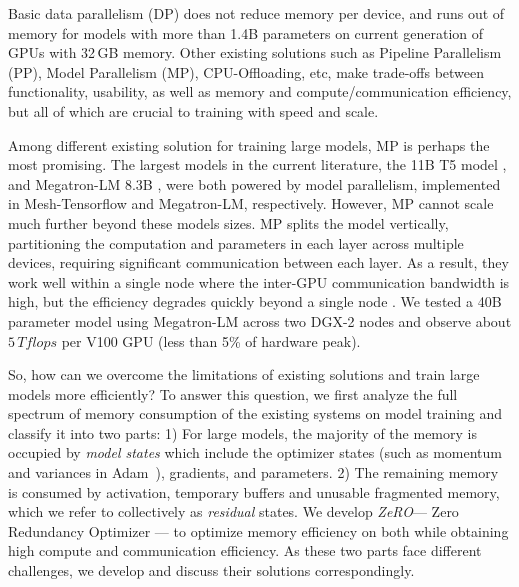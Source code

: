 \documentclass{article}
\newcommand{\name}{\emph{ZeRO}\xspace}
\begin{document}
Basic data parallelism (DP) does not reduce memory per device, and runs out of memory for models with more than 1.4B parameters on current generation of GPUs with 32\,GB memory. Other existing solutions such as Pipeline Parallelism (PP), Model Parallelism (MP), CPU-Offloading, etc, make trade-offs between functionality, usability, as well as memory and compute/communication efficiency, but all of which are crucial to training with speed and scale. 

Among different existing solution for training large models, MP is perhaps the most promising. The largest models in the current literature, the 11B T5 model \cite{T5}, and Megatron-LM 8.3B \cite{megatronlm}, were both powered by model parallelism, implemented in Mesh-Tensorflow \cite{DBLP:journals/corr/mesh-tensor} and Megatron-LM\cite{megatronlm}, respectively. However, MP cannot scale much further beyond these models sizes. MP splits the model vertically, partitioning the computation and parameters in each layer across multiple devices, requiring significant communication between each layer. As a result, they work well within a single node where the inter-GPU communication bandwidth is high, but the efficiency degrades quickly beyond a single node \cite{megatronlm}. We tested a 40B parameter model using Megatron-LM across two DGX-2 nodes and observe about $5\,Tflops$ per V100 GPU (less than 5\% of hardware peak).    

So, how can we overcome the limitations of existing solutions and train large models more efficiently? To answer this question, we first analyze the full spectrum of memory consumption of the existing systems on model training and classify it into two parts:  1) For large models, the majority of the memory is occupied by \emph{model states} which include the optimizer states (such as momentum and variances in Adam~\cite{DBLP:journals/corr/Adam}), gradients, and  parameters. 
2) The remaining memory is consumed by activation, temporary buffers and unusable fragmented memory, which we refer to collectively as \emph{residual} states.
We develop \name --- Zero Redundancy Optimizer  --- to optimize memory efficiency on both while obtaining high compute and communication efficiency.
As these two parts face different challenges, we develop and discuss their solutions correspondingly.
\end{document}
